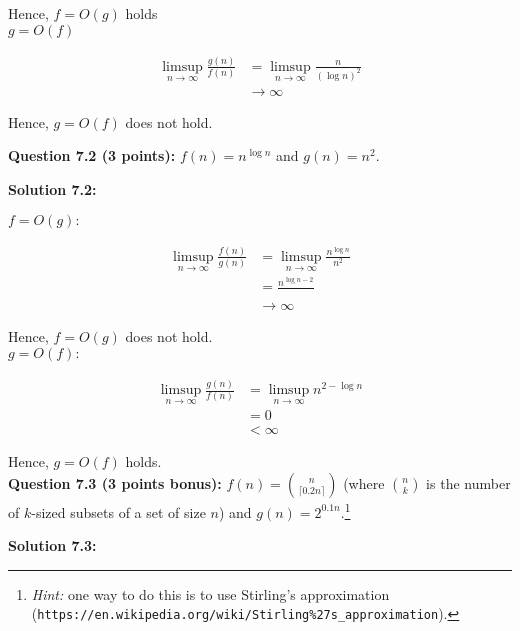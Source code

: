 \documentclass[11pt]{article}
\begin{document}
Hence, $f = O(g)$ holds\\

$g = O(f)$

\begin{align*}
    \limsup_{n \rightarrow \infty} \frac{g(n)}{f(n)} &=
    \limsup_{n \rightarrow \infty} \frac{n}{(\log{n})^{2}}\\
    &\rightarrow \infty
\end{align*}

Hence, $g = O(f)$ does not hold.

\textbf{Question 7.2 (3 points):} \(f(n)= n^{\log n}\) and
\(g(n) = n^2\).

\textbf{Solution 7.2:}

$f = O(g):$

\begin{align*}
    \limsup_{n \rightarrow \infty} \frac{f(n)}{g(n)} &=
    \limsup_{n \rightarrow \infty} \frac{n^{\log{n}}}{n^{2}}\\
    &= \frac{n^{\log{n} - 2}}{}\\
    &\rightarrow \infty
\end{align*}

Hence, $f = O(g)$ does not hold.\\

$g = O(f):$

\begin{align*}
    \limsup_{n \rightarrow \infty} \frac{g(n)}{f(n)} &=
    \limsup_{n \rightarrow \infty} n^{2 - \log{n}}\\
    &= 0\\
    &< \infty
\end{align*}

Hence, $g = O(f)$ holds.\\

\textbf{Question 7.3 (3 points bonus):}
\(f(n) = \binom{n}{\lceil 0.2 n \rceil}\) (where \(\binom{n}{k}\) is the
number of \(k\)-sized subsets of a set of size \(n\)) and
\(g(n) = 2^{0.1 n}\).\footnote{\emph{Hint:} one way to do this is to use
{Stirling's approximation} ({\tt https://en.wikipedia.org/wiki/Stirling\%27s\_approximation}).}

\textbf{Solution 7.3:}
\end{document}

